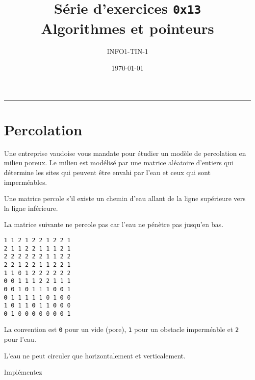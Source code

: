 



\date{\today}
\author{INFO1-TIN-1}
\title{Série d'exercices \texttt{0x13} \\ \textbf{Algorithmes et pointeurs}}
\maketitle

\noindent\rule{\textwidth}{.3pt}


\section{Percolation}

Une entreprise vaudoise vous mandate pour étudier un modèle de percolation en milieu poreux. Le milieu est modélisé par une matrice aléatoire d'entiers qui détermine les sites qui peuvent être envahi par l'eau et ceux qui sont imperméables. 

Une matrice percole s'il existe un chemin d'eau allant de la ligne supérieure vers la ligne inférieure. 

La matrice suivante ne percole pas car l'eau ne pénètre pas jusqu'en bas. 

\begin{lstlisting}
1 1 2 1 2 2 1 2 2 1
2 1 1 2 2 1 1 1 2 1
2 2 2 2 2 2 1 1 2 2
2 2 1 2 2 1 1 2 2 1
1 1 0 1 2 2 2 2 2 2
0 0 1 1 1 2 2 1 1 1 
0 0 1 0 1 1 1 0 0 1 
0 1 1 1 1 1 0 1 0 0
1 0 1 1 0 1 1 0 0 0 
0 1 0 0 0 0 0 0 0 1
\end{lstlisting}

La convention est \lstinline{0} pour un vide (pore), \lstinline{1} pour un obstacle imperméable et \lstinline{2} pour l'eau.

L'eau ne peut circuler que horizontalement et verticalement.

\begin{itemize}
Implémentez 
\end{itemize}


